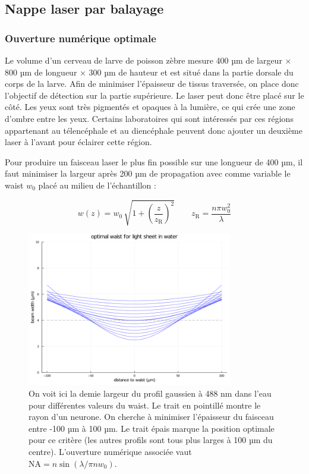 \subsection{Nappe laser par balayage}

\subsubsection{Ouverture numérique optimale}

Le volume d'un cerveau de larve de poisson zèbre mesure 400 µm de largeur × 800 µm de longueur × 300 µm de hauteur et est situé dans la partie dorsale du corps de la larve. Afin de minimiser l'épaisseur de tissus traversée, on place donc l'objectif de détection sur la partie supérieure. Le laser peut donc être placé sur le côté. Les yeux sont très pigmentés et opaques à la lumière, ce qui crée une zone d'ombre entre les yeux. Certains laboratoires qui sont intéressés par ces régions appartenant au télencéphale et au diencéphale peuvent donc ajouter un deuxième laser à l'avant pour éclairer cette région.

Pour produire un faisceau laser le plus fin possible sur une longueur de 400 µm, il faut minimiser la largeur après 200 µm de propagation avec comme variable le waist $w_0$ placé au milieu de l'échantillon :

$$
w(z) = w_0 \, \sqrt{ 1+ {\left( \frac{z}{z_\mathrm{R}} \right)}^2 } \qquad z_\mathrm{R} = \frac{n \pi w_0^2 }{\lambda}
$$

\begin{figure}
\centering
\includegraphics[width=0.8\textwidth]{./files/possible-waist_1P.png}
\caption{On voit ici la demie largeur du profil gaussien à 488 nm dans l'eau pour différentes valeurs du waist. Le trait en pointillé montre le rayon d'un neurone. On cherche à minimiser l'épaisseur du faisceau entre -100 µm à 100 µm. Le trait épais marque la position optimale pour ce critère (les autres profils sont tous plus larges à 100 µm du centre). L'ouverture numérique associée vaut $ \mathrm{NA} = n\sin(\lambda/\pi n w_0) $.}
\end{figure}

